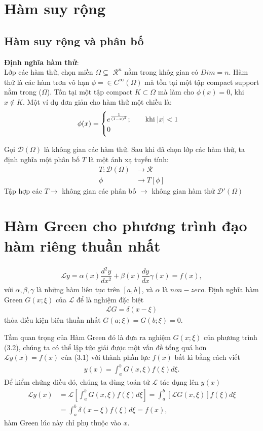 \documentclass{report}
\newcommand{\f}[2]{\dfrac{#1}{#2}}
\begin{document}
\chapter{Hàm suy rộng}
\section{Hàm suy rộng và phân bố}
\textbf{Định nghĩa hàm thử}:\\
Lớp các hàm thử, chọn miền $\Omega \subseteq$ $\mathscr{R}^n$ nằm trong khôg gian có $Dim = n$. Hàm thử là các hàm trơn vô hạn $\phi = \in C^{\infty}(\Omega)$ mà tồn tại một tập compact support nằm trong ($\Omega$). Tồn tại một tập compact $K \subset \Omega$ mà làm cho $\phi(x) = 0$, khi $x \notin K$. Một ví dụ đơn giản cho hàm thử một chiều là:
\begin{align*}
	\phi(x) =
	\begin{cases}
		e^{\frac{1}{(1-x)^2}}; \quad \quad \text{khi} \; \abs{x}<1 \\
		0
	\end{cases}
\end{align*}

Gọi $\mathcal{D}(\Omega)$ là không gian các hàm thử. Sau khi đã chọn lớp các hàm thử, ta định nghĩa một phân bố $T$ là một ánh xạ tuyến tính:
\begin{align*}
	T:  \mathcal{D}(\Omega) & \rightarrow \mathscr{R} \\
	\phi                    & \rightarrow T[\phi]
\end{align*}
Tập hợp các $T\rightarrow$ không gian các phân bố $\rightarrow$ không gian hàm thử $\mathcal{D}'(\Omega)$

\chapter{Hàm Green cho phương trình đạo hàm riêng thuần nhất}
\begin{align}
	\mathcal{L} y = \alpha(x) \f{d^2 y}{dx^2} + \beta(x)\f{dy}{dx} \gamma(x) = f(x),
\end{align}
với $\alpha,\beta,\gamma$ là những hàm liên tục trên $\left[a,b\right]$, và $\alpha$ là $non-zero$. Định nghĩa hàm Green $G(x;\xi)$ của $\mathcal{L}$ để là nghiệm đặc biệt
\begin{align}
	\mathcal{L} G = \delta (x-\xi)
\end{align}
thỏa điều kiện biên thuần nhất $G(a;\xi) = G(b;\xi) = 0$.

Tầm quan trọng của Hàm Green đó là đưa ra nghiệm $G(x;\xi)$ của phương trình (3.2), chúng ta có thể lập tức giải được một vấn đề tổng quá hơn $\mathcal{L} y(x) = f(x)$ của (3.1) với thành phần lực $f(x)$ bất kì bằng cách viết
\begin{align}
	y(x) = \int_{a}^{b} G(x,\xi) f(\xi) d\xi.
\end{align}
Để kiểm chứng điều đó, chúng ta dùng toán tử $\mathcal{L}$ tác dụng lên $y(x)$
\begin{align}
	\mathcal{L} y(x)
	 & = \mathcal{L} \left[ \int_{a}^{b} G(x,\xi) f(\xi) d\xi \right] = \int_{a}^{b} \left[ \mathcal{L} G(x,\xi) \right] f(\xi) d\xi \nonumber \\
	 & = \int_{a}^{b} \delta(x - \xi) f(\xi) d\xi = f(x),
\end{align}
hàm Green lúc này chỉ phụ thuộc vào $x$.
\end{document}
